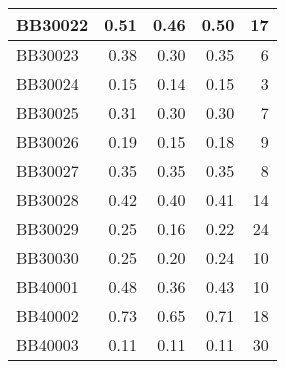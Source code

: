 \begin{longtable}{|l|r|r|r||r|}
	\hline
	BB30022 & \cellcolor[rgb]{ .988,  1,  .992}0.51 & \cellcolor[rgb]{ .384,  .745,  .478}0.46 & \cellcolor[rgb]{ .902,  .965,  .922}0.50 & \cellcolor[rgb]{ .98,  .663,  .675}17 \\
	\hline
	BB30023 & \cellcolor[rgb]{ .988,  1,  .992}0.38 & \cellcolor[rgb]{ .384,  .745,  .478}0.30 & \cellcolor[rgb]{ .8,  .922,  .831}0.35 & \cellcolor[rgb]{ .988,  .875,  .886}6 \\
	\hline
	BB30024 & \cellcolor[rgb]{ .988,  1,  .992}0.15 & \cellcolor[rgb]{ .384,  .745,  .478}0.14 & \cellcolor[rgb]{ .784,  .914,  .82}0.15 & \cellcolor[rgb]{ .988,  .933,  .945}3 \\
	\hline
	BB30025 & \cellcolor[rgb]{ .988,  1,  .992}0.31 & \cellcolor[rgb]{ .384,  .745,  .478}0.30 & \cellcolor[rgb]{ .725,  .89,  .769}0.30 & \cellcolor[rgb]{ .988,  .855,  .867}7 \\
	\hline
	BB30026 & \cellcolor[rgb]{ .988,  1,  .992}0.19 & \cellcolor[rgb]{ .384,  .745,  .478}0.15 & \cellcolor[rgb]{ .741,  .894,  .78}0.18 & \cellcolor[rgb]{ .984,  .816,  .827}9 \\
	\hline
	BB30027 & \cellcolor[rgb]{ .988,  1,  .992}0.35 & \cellcolor[rgb]{ .988,  1,  .992}0.35 & \cellcolor[rgb]{ .988,  1,  .992}0.35 & \cellcolor[rgb]{ .984,  .835,  .847}8 \\
	\hline
	BB30028 & \cellcolor[rgb]{ .988,  1,  .992}0.42 & \cellcolor[rgb]{ .384,  .745,  .478}0.40 & \cellcolor[rgb]{ .878,  .953,  .898}0.41 & \cellcolor[rgb]{ .984,  .722,  .729}14 \\
	\hline
	BB30029 & \cellcolor[rgb]{ .988,  1,  .992}0.25 & \cellcolor[rgb]{ .384,  .745,  .478}0.16 & \cellcolor[rgb]{ .761,  .902,  .796}0.22 & \cellcolor[rgb]{ .976,  .529,  .537}24 \\
	\hline
	BB30030 & \cellcolor[rgb]{ .988,  1,  .992}0.25 & \cellcolor[rgb]{ .384,  .745,  .478}0.20 & \cellcolor[rgb]{ .784,  .914,  .82}0.24 & \cellcolor[rgb]{ .984,  .796,  .808}10 \\
	\hline
	BB40001 & \cellcolor[rgb]{ .988,  1,  .992}0.48 & \cellcolor[rgb]{ .384,  .745,  .478}0.36 & \cellcolor[rgb]{ .745,  .898,  .784}0.43 & \cellcolor[rgb]{ .984,  .796,  .808}10 \\
	\hline
	BB40002 & \cellcolor[rgb]{ .988,  1,  .992}0.73 & \cellcolor[rgb]{ .384,  .745,  .478}0.65 & \cellcolor[rgb]{ .8,  .922,  .831}0.71 & \cellcolor[rgb]{ .98,  .643,  .655}18 \\
	\hline
	BB40003 & \cellcolor[rgb]{ .988,  1,  .992}0.11 & \cellcolor[rgb]{ .988,  1,  .992}0.11 & \cellcolor[rgb]{ .988,  1,  .992}0.11 & \cellcolor[rgb]{ .973,  .412,  .42}30 \\

\end{longtable}
